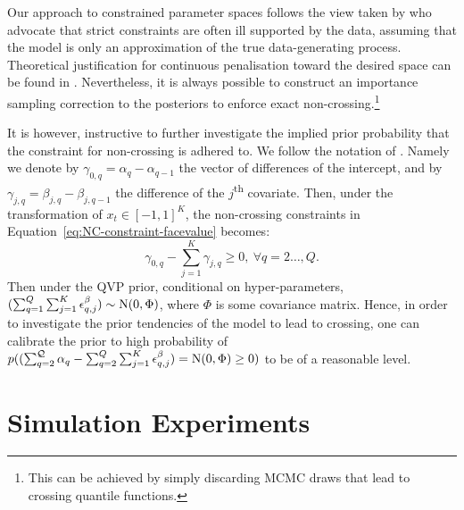 Our approach to constrained parameter spaces follows the view taken by \citet{simpson2017penalising} who advocate that strict constraints are often ill supported by the data, assuming that the model is only an approximation of the true data-generating process. Theoretical justification for continuous penalisation toward the desired space can be found in \citet{duan2020bayesian}. Nevertheless, it is always possible to construct an importance sampling correction to the posteriors to enforce exact non-crossing.\footnote{This can be achieved by simply discarding $\mathrm{MCMC}$ draws that lead to crossing quantile functions.}
%

%
It is however, instructive to further investigate the implied prior probability that the constraint for non-crossing is adhered to. We follow the notation of \citet{bondell2010noncrossing}. Namely we denote by $\gamma_{0,q}=\alpha_q-\alpha_{q-1}$ the vector of differences of the intercept, and by $\gamma_{j,q}=\beta_{j,q}-\beta_{j,q-1}$ the difference of the $j$\textsuperscript{th} covariate. Then, under the transformation of $x_t \in [-1,1]^K$,  the non-crossing constraints in Equation~\ref{eq:NC-constraint-facevalue} becomes:
% 
\begin{equation}
    \gamma_{0,q} - \sum_{j=1}^K \gamma_{j,q} \geq 0,~\forall q=2\dots,Q.
\end{equation}
% 
Then under the QVP prior, conditional on hyper-parameters, $(\sum_{q=1}^Q\sum_{j=1}^K \epsilon_{q,j}^{\beta}) \sim \mathrm{N}(0,\Phi)$, where $\Phi$ is some covariance matrix. Hence, in order to investigate the prior tendencies of the model to lead to crossing, one can calibrate the prior to high probability of $p((\sum_{q=2}^{\mathcal{Q}}\alpha_q-\sum_{q=2}^Q\sum_{j=1}^K \epsilon_{q,j}^{\beta}) = \mathrm{N}(0,\Phi) \geq 0)$ to be of a reasonable level.


\section{Simulation Experiments}\label{app:extra-sim-results}

